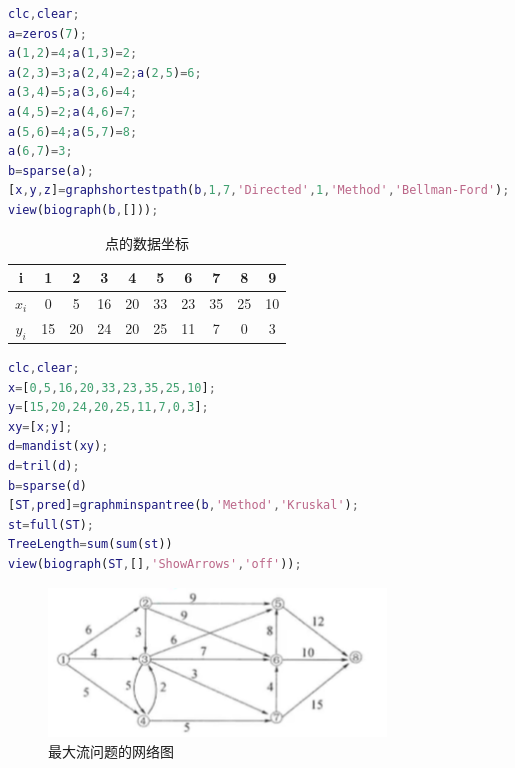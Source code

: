 \documentclass[a4paper,20pt]{article}
\begin{document}
\begin{center}
    \begin{lstlisting}[caption={Example2.m},language=Matlab]
        %This is example2.m
clc,clear;
a=zeros(7);
a(1,2)=4;a(1,3)=2;
a(2,3)=3;a(2,4)=2;a(2,5)=6;
a(3,4)=5;a(3,6)=4;
a(4,5)=2;a(4,6)=7;
a(5,6)=4;a(5,7)=8;
a(6,7)=3;
b=sparse(a);
[x,y,z]=graphshortestpath(b,1,7,'Directed',1,'Method','Bellman-Ford');
view(biograph(b,[]));
        \end{lstlisting}
\end{center}

\par {}
\begin{center}
    \begin{table}[h]
        \centering
        \caption{点的数据坐标}
        \begin{tabular}{c|c|c|c|c|c|c|c|c|c}
            \hline
            i     & 1  & 2  & 3  & 4  & 5  & 6  & 7  & 8  & 9  \\
            \hline
            $x_i$ & 0  & 5  & 16 & 20 & 33 & 23 & 35 & 25 & 10 \\
            \hline
            $y_i$ & 15 & 20 & 24 & 20 & 25 & 11 & 7  & 0  & 3  \\
            \hline
        \end{tabular}
    \end{table}
\end{center}
\begin{center}
    \begin{lstlisting}[caption={Example3.m},language=Matlab]
        %This is example3.m
clc,clear;
x=[0,5,16,20,33,23,35,25,10];
y=[15,20,24,20,25,11,7,0,3];
xy=[x;y];
d=mandist(xy);
d=tril(d);
b=sparse(d)
[ST,pred]=graphminspantree(b,'Method','Kruskal');
st=full(ST);
TreeLength=sum(sum(st))
view(biograph(ST,[],'ShowArrows','off'));
        \end{lstlisting}
\end{center}
\par {}
\begin{figure}[h]
    \begin{center}
        \includegraphics[width=0.8\textwidth]{figure4.png}
        \caption{最大流问题的网络图}
    \end{center}
\end{figure}
\end{document}
